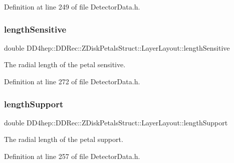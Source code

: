 Definition at line 249 of file Detector\+Data.\+h.

\hypertarget{struct_d_d4hep_1_1_d_d_rec_1_1_z_disk_petals_struct_1_1_layer_layout_a4508db5622466189d102ac9289c6c3b9}{}\label{struct_d_d4hep_1_1_d_d_rec_1_1_z_disk_petals_struct_1_1_layer_layout_a4508db5622466189d102ac9289c6c3b9} 
\subsubsection{\texorpdfstring{length\+Sensitive}{lengthSensitive}}
{\footnotesize\ttfamily double D\+D4hep\+::\+D\+D\+Rec\+::\+Z\+Disk\+Petals\+Struct\+::\+Layer\+Layout\+::length\+Sensitive}



The radial length of the petal sensitive. 



Definition at line 272 of file Detector\+Data.\+h.

\hypertarget{struct_d_d4hep_1_1_d_d_rec_1_1_z_disk_petals_struct_1_1_layer_layout_a67fb8540056b8f6523fefa061c7b5aa8}{}\label{struct_d_d4hep_1_1_d_d_rec_1_1_z_disk_petals_struct_1_1_layer_layout_a67fb8540056b8f6523fefa061c7b5aa8} 
\subsubsection{\texorpdfstring{length\+Support}{lengthSupport}}
{\footnotesize\ttfamily double D\+D4hep\+::\+D\+D\+Rec\+::\+Z\+Disk\+Petals\+Struct\+::\+Layer\+Layout\+::length\+Support}



The radial length of the petal support. 



Definition at line 257 of file Detector\+Data.\+h.


